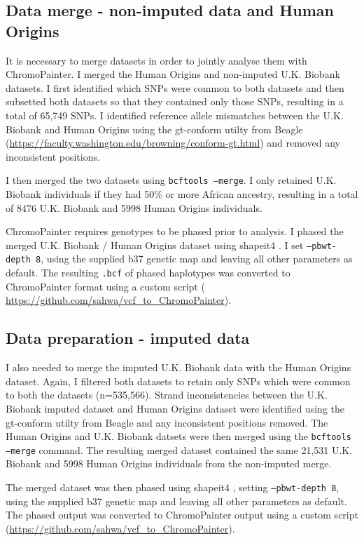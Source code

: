 \subsection{Data merge - non-imputed data and Human Origins}

It is necessary to merge datasets in order to jointly analyse them with ChromoPainter. I merged the Human Origins and non-imputed U.K. Biobank datasets. I first identified which SNPs were common to both datasets and then subsetted both datasets so that they contained only those SNPs, resulting in a total of 65,749 SNPs. I identified reference allele mismatches between the U.K. Biobank and Human Origins using the gt-conform utilty from Beagle (\url{https://faculty.washington.edu/browning/conform-gt.html}) and removed any inconsistent positions. 

I then merged the two datasets using \texttt{bcftools --merge}. I only retained U.K. Biobank individuals if they had 50\% or more African ancestry, resulting in a total of 8476 U.K. Biobank and 5998 Human Origins individuals. 

ChromoPainter requires genotypes to be phased prior to analysis. I phased the merged U.K. Biobank / Human Origins dataset using shapeit4 \cite{delaneau2018integrative}. I set \texttt{--pbwt-depth 8}, using the supplied b37 genetic map and leaving all other parameters as default. The resulting \texttt{.bcf} of phased haplotypes was converted to ChromoPainter format using a custom script ( \url{https://github.com/sahwa/vcf_to_ChromoPainter}).  

\subsection{Data preparation - imputed data}

I also needed to merge the imputed U.K. Biobank data with the Human Origins dataset. Again, I filtered both datasets to retain only SNPs which were common to both the datasets (n=535,566). Strand inconsistencies between the U.K. Biobank imputed dataset and Human Origins dataset were identified using the gt-conform utilty from Beagle and any inconsistent positions removed. The Human Origins and U.K. Biobank datsets were then merged using the \texttt{bcftools --merge} command. The resulting merged dataset contained the same 21,531 U.K. Biobank and 5998 Human Origins individuals from the non-imputed merge.

The merged dataset was then phased using shapeit4 \cite{delaneau2018integrative}, setting \texttt{--pbwt-depth 8}, using the supplied b37 genetic map and leaving all other parameters as default. The phased output was converted to ChromoPainter output using a custom script (\url{https://github.com/sahwa/vcf_to_ChromoPainter}).

